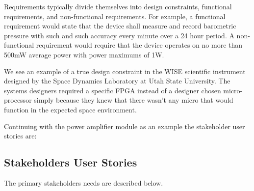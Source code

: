 \begin{slshape}
Requirements typically divide themselves into design constraints, functional requirements, and non-functional requirements.  For example, a functional requirement would state that the device shall measure and record barometric pressure with such and such accuracy every minute over a 24 hour period.  A non-functional requirement would require that the device operates on no more than 500mW average power with power maximums of 1W.
\bigskip   

We see an example of a true design constraint in the WISE scientific instrument designed by the Space Dynamics Laboratory at Utah State University.  The systems designers required a specific FPGA instead of a designer chosen micro-processor simply because they knew that there wasn't any micro that would function in the expected space environment.
\bigskip

Continuing with the power amplifier module as an example the stakeholder user stories are:
\bigskip
 		
\end{slshape}

\subsection{Stakeholders User Stories}

The primary stakeholders needs are described below.

